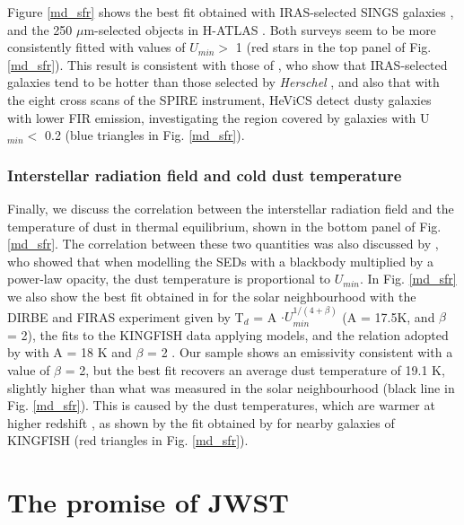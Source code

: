 \documentclass{aa}
\begin{document}
Figure \ref{md_sfr} shows the best fit obtained with IRAS-selected SINGS galaxies \citep{dac2}, and the 250 $\mu$m-selected objects in H-ATLAS \citep{smi}. Both surveys seem to be more consistently fitted with values of $U_{min} >$ 1 (red stars in the top panel of Fig. \ref{md_sfr}). This result is consistent with those of \cite{pap2}, who show that IRAS-selected galaxies tend to be hotter than those selected by {\it Herschel} \citep[see also][and their analysis]{smi}, and also that with the eight cross scans of the SPIRE instrument, HeViCS detect dusty galaxies with lower FIR emission, investigating the region covered by galaxies with U$_{min} <$ 0.2 (blue triangles in Fig. \ref{md_sfr}).

\subsubsection*{Interstellar radiation field and cold dust temperature}

Finally, we discuss the correlation between the interstellar radiation field and the temperature of dust in thermal equilibrium, shown in the bottom panel of Fig. \ref{md_sfr}. The correlation between these two quantities was also discussed by \cite{ani}, who showed that when modelling the \cite{dra} SEDs with a blackbody multiplied by a power-law opacity, the dust temperature is proportional to $U_{min}$. In Fig. \ref{md_sfr} we also show the best fit obtained in \cite{boul} for the solar neighbourhood with the DIRBE and FIRAS experiment given by T$_d$ = A $\cdot U_{min}^{1/(4+\beta)}$ (A = 17.5K, and $\beta$ = 2), the fits to the KINGFISH data applying \cite{dra} models, and the relation adopted by \citet{dra} with A = 18 K and $\beta$ = 2 \citep[see Eq. 13 in][]{dra3}. Our sample shows an emissivity consistent with a value of $\beta$ = 2, but the best fit recovers an average dust temperature of 19.1 K, slightly higher than what was measured in the solar neighbourhood (black line in Fig. \ref{md_sfr}). This is caused by the dust temperatures, which are warmer at higher redshift \citep{dun}, as shown by the fit obtained by \cite{hun} for nearby galaxies of KINGFISH (red triangles in Fig. \ref{md_sfr}).

\section{The promise of JWST}
\label{jwst}
\end{document}
